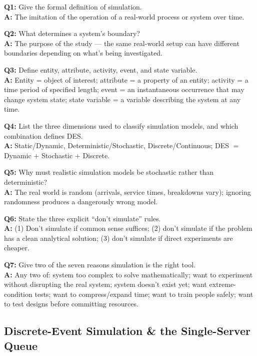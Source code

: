 \begin{qabox}
\textbf{Q1:} Give the formal definition of simulation. \\
\textbf{A:} The imitation of the operation of a real-world process or system over time.

\textbf{Q2:} What determines a system's boundary? \\
\textbf{A:} The purpose of the study — the same real-world setup can have different boundaries depending on what's being investigated.

\textbf{Q3:} Define entity, attribute, activity, event, and state variable. \\
\textbf{A:} Entity = object of interest; attribute = a property of an entity; activity = a time period of specified length; event = an instantaneous occurrence that may change system state; state variable = a variable describing the system at any time.

\textbf{Q4:} List the three dimensions used to classify simulation models, and which combination defines DES. \\
\textbf{A:} Static/Dynamic, Deterministic/Stochastic, Discrete/Continuous; DES $=$ Dynamic $+$ Stochastic $+$ Discrete.

\textbf{Q5:} Why must realistic simulation models be stochastic rather than deterministic? \\
\textbf{A:} The real world is random (arrivals, service times, breakdowns vary); ignoring randomness produces a dangerously wrong model.

\textbf{Q6:} State the three explicit ``don't simulate'' rules. \\
\textbf{A:} (1) Don't simulate if common sense suffices; (2) don't simulate if the problem has a clean analytical solution; (3) don't simulate if direct experiments are cheaper.

\textbf{Q7:} Give two of the seven reasons simulation is the right tool. \\
\textbf{A:} Any two of: system too complex to solve mathematically; want to experiment without disrupting the real system; system doesn't exist yet; want extreme-condition tests; want to compress/expand time; want to train people safely; want to test designs before committing resources.
\end{qabox}

\subsection{Discrete-Event Simulation \& the Single-Server Queue}

